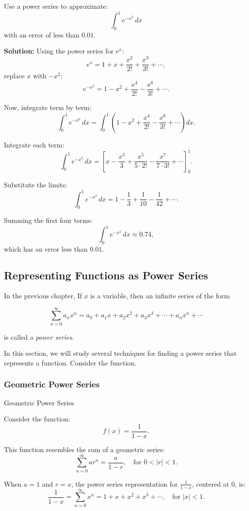 \documentclass[12pt]{article}
\theoremstyle{beautifulthm}
\begin{document}
\begin{tcolorbox}[colback=examplebg, colframe=red!75!black, title=\textbf{EXAMPLE 8: Power Series Approximation of a Definite Integral}, fonttitle=\bfseries, sharp corners]

Use a power series to approximate:
\[
\int_0^1 e^{-x^2} \, dx
\]
with an error of less than $0.01$.

\tcblower
\textbf{Solution:} 
Using the power series for $e^x$:
\[
e^x = 1 + x + \frac{x^2}{2!} + \frac{x^3}{3!} + \cdots,
\]
replace $x$ with $-x^2$:
\[
e^{-x^2} = 1 - x^2 + \frac{x^4}{2!} - \frac{x^6}{3!} + \cdots.
\]

Now, integrate term by term:
\[
\int_0^1 e^{-x^2} \, dx = \int_0^1 \left( 1 - x^2 + \frac{x^4}{2!} - \frac{x^6}{3!} + \cdots \right) dx.
\]

Integrate each term:
\[
\int_0^1 e^{-x^2} \, dx = \left[ x - \frac{x^3}{3} + \frac{x^5}{5 \cdot 2!} - \frac{x^7}{7 \cdot 3!} + \cdots \right]_0^1.
\]

Substitute the limits:
\[
\int_0^1 e^{-x^2} \, dx = 1 - \frac{1}{3} + \frac{1}{10} - \frac{1}{42} + \cdots.
\]

Summing the first four terms:
\[
\int_0^1 e^{-x^2} \, dx \approx 0.74,
\]
which has an error less than $0.01$.
\end{tcolorbox}
\newpage
\subsection{Representing
Functions as
Power Series}

In the previous chapter, If $x$ is a variable, then an infinite series of the form

\[
\sum_{n=0}^\infty a_n x^n = a_0 + a_1 x + a_2 x^2 + a_3 x^3 + \cdots + a_n x^n + \cdots
\]

is called a \textit{power series}. 

In this section, we will study several techniques for finding a power series that represents a function. Consider the function.

\subsubsection{Geometric Power Series}

\begin{Note}{Geometric Power Series}{}

Consider the function:
\[
f(x) = \frac{1}{1-x}.
\]

This function resembles the sum of a geometric series:
\[
\sum_{n=0}^\infty ar^n = \frac{a}{1-r}, \quad \text{for } 0 < |r| < 1.
\]

When $a = 1$ and $r = x$, the power series representation for $\frac{1}{1-x}$, centered at $0$, is:
\[
\frac{1}{1-x} = \sum_{n=0}^\infty x^n = 1 + x + x^2 + x^3 + \cdots, \quad \text{for } |x| < 1.
\]
    
\end{Note}
\end{document}
